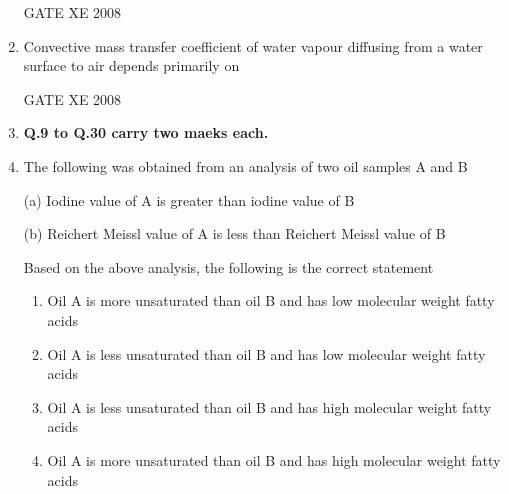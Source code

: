 \documentclass[12pt]{article}
\begin{document}
\begin{enumerate}
\begin{enumerate}
\end{enumerate}
    
    GATE XE 2008

    \item Convective mass transfer coefficient of water vapour diffusing from a water surface to air depends primarily on 

\begin{enumerate}
\end{enumerate}
    
    GATE XE 2008

\item[] \textbf{Q.9 to Q.30 carry two maeks each.}    

\item The following was obtained from an analysis of two oil samples A and B  

(a) Iodine value of A is greater than iodine value of B  

(b) Reichert Meissl value of A is less than Reichert Meissl value of B  

Based on the above analysis, the following is the correct statement  

\begin{enumerate}
\item  Oil A is more unsaturated than oil B and has low molecular weight fatty acids
\item  Oil A is less unsaturated than oil B and has low molecular weight fatty acids 
\item  Oil A is less unsaturated than oil B and has high molecular weight fatty acids
\item Oil A is more unsaturated than oil B and has high molecular weight fatty acids  
\end{enumerate}


\end{enumerate}
\end{document}
